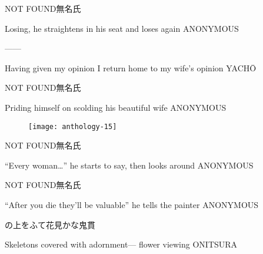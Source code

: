 \begin{haiku}
    {NOT FOUND}\hfill{\FH 無名氏}

    \vin{} Losing,
    \vin{} \vin{} he straightens in his seat
    \vin{} \vin{} \vin{} and loses again \hspace{\fill} ANONYMOUS
\end{haiku}

\begin{haiku}
   ---\hfill{---}

    \vin{} Having given my opinion
    \vin{} \vin{} I return home to
    \vin{} \vin{} \vin{} my wife's opinion \hspace{\fill} YACH\={O}
\end{haiku}

\begin{haiku}
    {NOT FOUND}\hfill{\FH 無名氏}

    \vin{} Priding himself
    \vin{} \vin{} on scolding
    \vin{} \vin{} \vin{} his beautiful wife \hspace{\fill} ANONYMOUS
\end{haiku}

\begin{figure}
    \texttt{[image: anthology-15]}
\end{figure}

\begin{haiku}
    {NOT FOUND}\hfill{\FH 無名氏}

    \vin{} ``Every woman\ldots''
    \vin{} \vin{} he starts to say,
    \vin{} \vin{} \vin{} then looks around \hspace{\fill} ANONYMOUS
\end{haiku}

\begin{haiku}
    {NOT FOUND}\hfill{\FH 無名氏}

    \vin{} ``After you die
    \vin{} \vin{} they'll be valuable''
    \vin{} \vin{} \vin{} he tells the painter \hspace{\fill} ANONYMOUS
\end{haiku}

\begin{haiku}
    {\FH {}の上をふて花見かな}\hfill{\FH 鬼貫}

    \vin{} Skeletons
    \vin{} \vin{} covered with adornment---
    \vin{} \vin{} \vin{} flower viewing \hspace{\fill} ONITSURA
\end{haiku}

